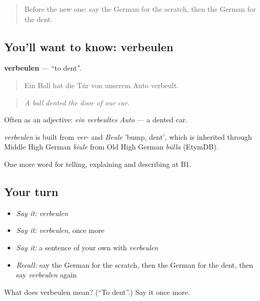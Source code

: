 \label{lesson:GE-C405-verbeulen}



\begin{quote}
Before the new one: say the German for the scratch, then the German for the dent.
\end{quote}

\subsection*{You'll want to know: verbeulen}
\textbf{verbeulen} — \textquotedblleft{}to dent\textquotedblright{}.

\begin{quote}
Ein Ball hat die Tür von unserem Auto verbeult.
\end{quote}

\begin{quote}
\emph{A ball dented the door of our car.}
\end{quote}

Often as an adjective: \emph{ein verbeultes Auto} — a dented car.

\begin{cousinweb}
\emph{verbeulen} is built from \emph{ver-} and \emph{Beule} 'bump, dent', which is inherited through Middle High German \emph{biule} from Old High German \emph{būlla} (EtymDB).
\end{cousinweb}

\begin{grammarlens}[title={What you've built}]
One more word for telling, explaining and describing at B1.
\end{grammarlens}

\subsection*{Your turn}
\begin{itemize}
\raggedright
  \item \emph{Say it:} \emph{verbeulen}
  \item \emph{Say it:} \emph{verbeulen}, once more
  \item \emph{Say it:} a sentence of your own with \emph{verbeulen}
  \item \emph{Recall:} say the German for the scratch, then the German for the dent, then say \emph{verbeulen} again
\end{itemize}

\begin{tcolorbox}[breakable,colback=teal!4,colframe=teal!35!black,title={Before you move on}]
What does verbeulen mean? (\textquotedblleft{}To dent\textquotedblright{}.) Say it once more.
\end{tcolorbox}
